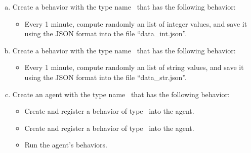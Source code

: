 \documentclass[english,nodocumentinfo,nopubpage]{utbmciadreport}
\begin{document}
\begin{enumerate}[a)]
\item Create a behavior with the type name \ that has the following behavior:
	\begin{itemize}
	\item Every 1 minute, compute randomly an list of integer values, and save it using the JSON format into the file ``data\_int.json''.
	\end{itemize}
\item Create a behavior with the type name \ that has the following behavior:
	\begin{itemize}
	\item Every 1 minute, compute randomly an list of string values, and save it using the JSON format into the file ``data\_str.json''.
	\end{itemize}
\item Create an agent with the type name \ that has the following behavior:
	\begin{itemize}
	\item Create and register a behavior of type \ into the agent.
	\item Create and register a behavior of type \ into the agent.
	\item Run the agent's behaviors.
	\end{itemize}
\end{enumerate}
\end{document}
